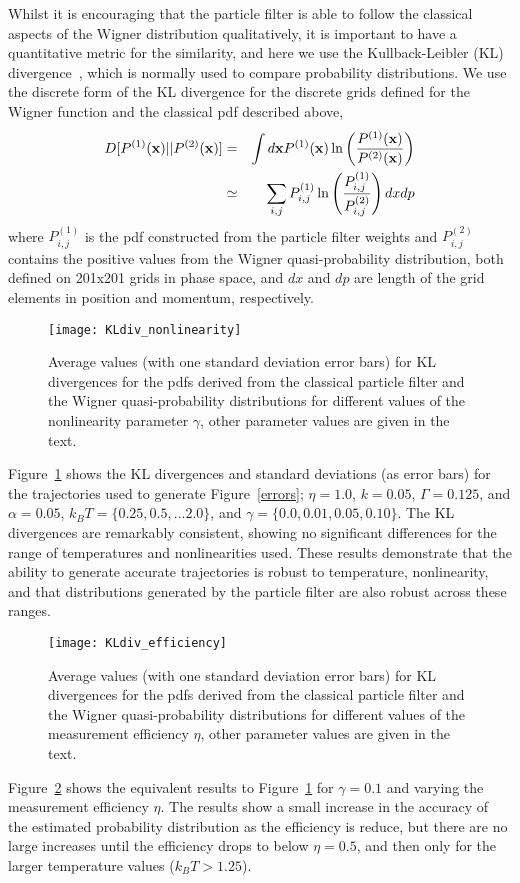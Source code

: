 \documentclass[conference]{IEEEtran}
\begin{document}
Whilst it is encouraging that the particle filter is able to follow the classical aspects of the Wigner distribution qualitatively, it is important to have a quantitative metric for the similarity, and here we use the Kullback-Leibler (KL) divergence~\cite{Rol2012}, which is normally used to compare probability distributions. We use the discrete form of the KL divergence for the discrete grids defined for the Wigner function and the classical pdf described above,
\begin{eqnarray}
D[P^{(1)}({\bf x})||P^{(2)}({\bf x})] &=& \int d{\bf x} P^{(1)}({\bf x}) \ln\left(\frac{P^{(1)}({\bf x})}{P^{(2)}({\bf x})} \right) \nonumber \\
&\simeq &\sum_{i,j} P^{(1)}_{i,j} \ln\left(\frac{P^{(1)}_{i,j}}{P^{(2)}_{i,j}} \right) dx dp  \nonumber \\
\end{eqnarray}
where $P^{(1)}_{i,j} $ is the pdf constructed from the particle filter weights and $P^{(2)}_{i,j}$ contains the positive values from the Wigner quasi-probability distribution, both defined on 201x201 grids in phase space, and $dx$ and $dp$ are length of the grid elements in position and momentum, respectively. 

\begin{figure}[htbp]
       \centering
		\texttt{[image: KLdiv\_nonlinearity]} 
			\caption{\label{KL} Average values (with one standard deviation error bars) for KL divergences for the pdfs derived from the classical particle filter and the Wigner quasi-probability distributions for different values of the nonlinearity parameter $\gamma$, other parameter values are given in the text.}
\end{figure}
Figure~\ref{KL} shows the KL divergences and standard deviations (as error bars) for the trajectories used to generate Figure~\ref{errors}; $\eta = 1.0$, $k = 0.05$, $\Gamma = 0.125$, and $\alpha = 0.05$, $k_B T = \{0.25, 0.5,... 2.0\}$, and $\gamma = \{0.0, 0.01, 0.05, 0.10\}$. The KL divergences are remarkably consistent, showing no significant differences for the range of temperatures and nonlinearities used. These results demonstrate that the ability to generate accurate trajectories is robust to temperature, nonlinearity, and that distributions generated by the particle filter are also robust across these ranges. 

\begin{figure}[htbp]
       \centering
		\texttt{[image: KLdiv\_efficiency]} 
			\caption{\label{KLeta} Average values (with one standard deviation error bars) for KL divergences for the pdfs derived from the classical particle filter and the Wigner quasi-probability distributions for different values of the measurement efficiency $\eta$, other parameter values are given in the text.}
\end{figure}
Figure~\ref{KLeta} shows the equivalent results to Figure~\ref{KL} for $\gamma = 0.1$ and varying the measurement efficiency $\eta$. The results show a small increase in the accuracy of the estimated probability distribution as the efficiency is reduce, but there are no large increases until the efficiency drops to below $\eta = 0.5$, and then only for the larger temperature values ($k_B T > 1.25$). 
\end{document}
